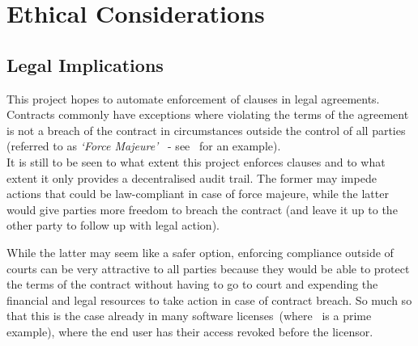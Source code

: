 
\chapter{Ethical Considerations}\label{ch:ethical}

\section{Legal Implications}\label{sec:legal-implications}

 This project hopes to automate enforcement of clauses in legal agreements.
Contracts commonly have exceptions where violating the terms of the agreement is not a breach of the contract in
circumstances outside the control of all parties (referred to as \textit{`Force Majeure'}~\cite{forceMajeureDefinition} -
see~\cite[]{jetbrainsEduLicence} for an example).\\

It is still to be seen to what extent this project enforces clauses and to what extent it only provides
a decentralised audit trail.
The former may impede actions that could be law-compliant in case of force majeure, while the latter
would give parties more freedom to breach the contract (and leave it up to the other party to follow up with legal
action).

While the latter may seem like a safer option, enforcing compliance outside of courts can be very attractive to all
parties because they would be able to protect the terms of the contract without having to go to court and expending the
financial and legal resources to take action in case of contract breach.
So much so that this is the case already in many software licenses~(where~\cite{jetbrainsEduLicence} is a prime example),
where the end user has their access revoked before the licensor.
